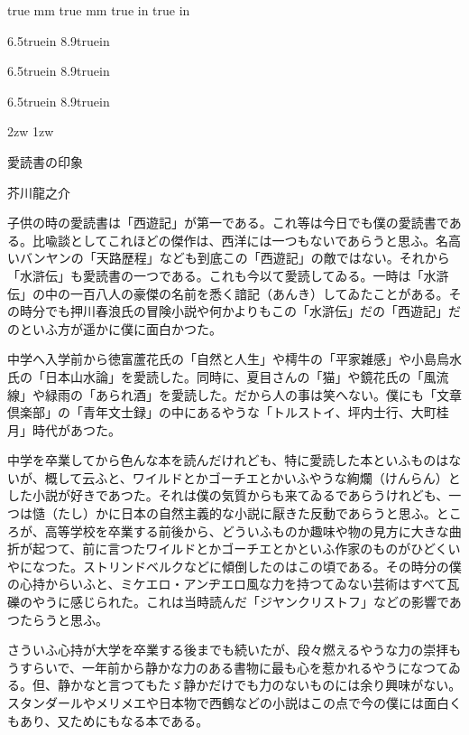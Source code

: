 
 true mm
 true mm
 true in
 true in

\tate%
{}

\iftdir
  \vsize6.5truein
  \hsize8.9truein
\fi

\ifydir
  \hsize6.5truein
  \vsize8.9truein
\fi

\ifddir
  \vsize6.5truein
  \hsize8.9truein
\fi

\mc
\parindent2zw
\parskip1zw

\centerline{\gt 愛読書の印象}
\centerline{\gt 芥川龍之介}

\bigskip

子供の時の愛読書は「西遊記」が第一である。これ等は今日でも僕の愛読書である。比喩談としてこれほどの傑作は、西洋には一つもないであらうと思ふ。名高いバンヤンの「天路歴程」なども到底この「西遊記」の敵ではない。それから「水滸伝」も愛読書の一つである。これも今以て愛読してゐる。一時は「水滸伝」の中の一百八人の豪傑の名前を悉く諳記（あんき）してゐたことがある。その時分でも押川春浪氏の冒険小説や何かよりもこの「水滸伝」だの「西遊記」だのといふ方が遥かに僕に面白かつた。

中学へ入学前から徳富蘆花氏の「自然と人生」や樗牛の「平家雑感」や小島烏水氏の「日本山水論」を愛読した。同時に、夏目さんの「猫」や鏡花氏の「風流線」や緑雨の「あられ酒」を愛読した。だから人の事は笑へない。僕にも「文章倶楽部」の「青年文士録」の中にあるやうな「トルストイ、坪内士行、大町桂月」時代があつた。

中学を卒業してから色んな本を読んだけれども、特に愛読した本といふものはないが、概して云ふと、ワイルドとかゴーチエとかいふやうな絢爛（けんらん）とした小説が好きであつた。それは僕の気質からも来てゐるであらうけれども、一つは慥（たし）かに日本の自然主義的な小説に厭きた反動であらうと思ふ。ところが、高等学校を卒業する前後から、どういふものか趣味や物の見方に大きな曲折が起つて、前に言つたワイルドとかゴーチエとかといふ作家のものがひどくいやになつた。ストリンドベルクなどに傾倒したのはこの頃である。その時分の僕の心持からいふと、ミケエロ・アンヂエロ風な力を持つてゐない芸術はすべて瓦礫のやうに感じられた。これは当時読んだ「ジヤンクリストフ」などの影響であつたらうと思ふ。

さういふ心持が大学を卒業する後までも続いたが、段々燃えるやうな力の崇拝もうすらいで、一年前から静かな力のある書物に最も心を惹かれるやうになつてゐる。但、静かなと言つてもたゞ静かだけでも力のないものには余り興味がない。スタンダールやメリメエや日本物で西鶴などの小説はこの点で今の僕には面白くもあり、又ためにもなる本である。

